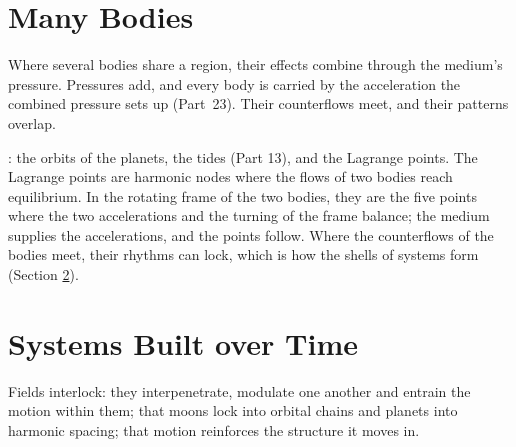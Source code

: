 \documentclass[11pt,a4paper]{article}
\begin{document}
\section{Many Bodies}
\label{sec:many}

\begin{hypbar}
Where several bodies share a region, their effects combine through the medium's pressure. Pressures add, and every body is carried by the acceleration the combined pressure sets up (Part~23). Their counterflows meet, and their patterns overlap.
\end{hypbar}

: the orbits of the planets, the tides (Part 13), and the Lagrange points. The Lagrange points are harmonic nodes where the flows of two bodies reach equilibrium. In the rotating frame of the two bodies, they are the five points where the two accelerations and the turning of the frame balance; the medium supplies the accelerations, and the points follow. Where the counterflows of the bodies meet, their rhythms can lock, which is how the shells of systems form (Section \ref{sec:time}). 

\section{Systems Built over Time}
\label{sec:time}

Fields interlock: they interpenetrate, modulate one another and entrain the motion within them; that moons lock into orbital chains and planets into harmonic spacing; that motion reinforces the structure it moves in. 
\end{document}
